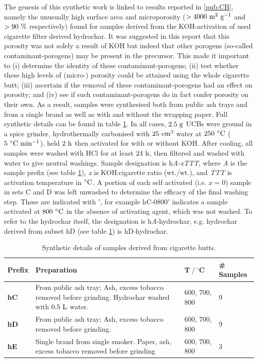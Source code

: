 The genesis of this synthetic work is linked to results reported in \ref{pub:CB}, namely the unusually high surface area and microporosity ($ \rm > 4000\ m^2\ g^{-1}$ and $\rm > 90\ \%$ respectively) found for samples derived from the KOH-activation of used cigarette filter derived hydrochar. It was suggested in this report that this porosity was not solely a result of KOH but indeed that other porogens (so-called contaminant-porogens) may be present in the precursor. This made it important to (i) determine the identity of these  contaminant-porogens; (ii) test whether these high levels of (micro-) porosity could be attained using the whole cigarette butt; (iii) ascertain if the removal of these contaminant-porogens had an effect on porosity; and (iv) see if such contaminant-porogens do in fact confer porosity on their own. As a result, samples were synthesised both from public ash trays and from a single brand as well as with and without the wrapping paper. Full synthetic details can be found in table \ref{tb:cb_synthesis}. In all cases, $\rm 2.5\ g$ UCBs were ground in a spice grinder, hydrothermally carbonised with $\rm 25\ cm^3$ water at $\rm 250\ ^{\circ}C$ ($\rm 5\ ^{\circ}C\ min^{-1}$), held $\rm 2\ h$ then activated for with or without KOH. After cooling, all samples were washed with HCl for at least $\rm 24\ h$, then filtered and washed with water to give neutral washings. Sample designation is h\textit{A-xTTT}, where \textit{A} is the sample prefix (see table \ref{tb:cb_synthesis}), \textit{x} is KOH:cigarette ratio (wt./wt.), and \textit{TTT} is activation temperature in $\rm ^{\circ}C$. A portion of each self activated (i.e. $x = 0$) sample in sets C and D was left unwashed to determine the efficacy of the final washing step. These are indicated with $'$, for example hC-0800$'$ indicates a sample activated at $\rm 800\ ^{\circ}C$ in the absence of activating agent, which was not washed. To refer to the hydrochar itself, the designation is h\textit{A}-hydrochar, e.g. hydrochar derived from subset hD (see table \ref{tb:cb_synthesis}) is hD-hydrochar.

\begin{table}[t]
    \caption{Synthetic details of samples derived from cigarette butts.}
    \label{tb:cb_synthesis}
    \begin{tabularx}{\textwidth}{lXll}
        \toprule
            \textbf{Prefix} & \textbf{Preparation} & $\mathbf{T\ /\ ^{\circ}C}$ & \textbf{\# Samples} \\ 
        \midrule
            \textbf{hC}     & From public ash tray; Ash, excess tobacco removed before grinding. Hydrochar washed with $\rm 0.5\ L$ water.              & 600, 700, 800 & 9              \\
            \textbf{hD}     &  From public ash tray; Ash, excess tobacco removed before grinding.             & 600, 700, 800 & 9             \\
            \textbf{hE}     & Single brand from single smoker. Paper, ash, excess tobacco removed before grinding              & 600, 700, 800 & 3              \\
        \bottomrule
    \end{tabularx}%
\end{table}

